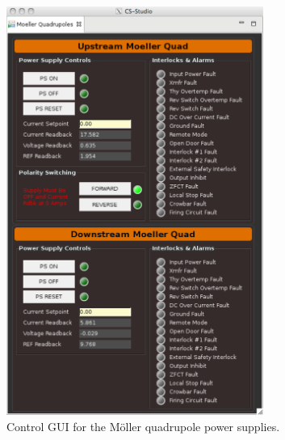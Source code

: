\begin{enumerate}
\begin{enumerate}
\begin{figure}
\begin{center}
\includegraphics[width=0.75\textwidth]{moller_quad.pdf}
\caption{Control GUI for the M{\"o}ller quadrupole power supplies.}
\label{moller_quad}
\end{center}
\end{figure}





\end{enumerate}
\end{enumerate}
